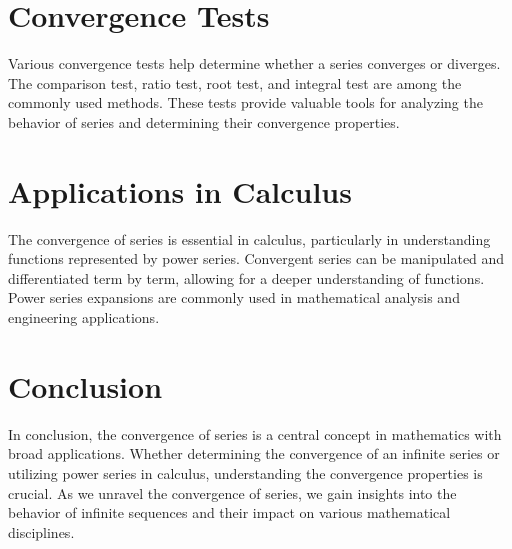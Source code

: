 \documentclass{article}
\begin{document}
\section*{Convergence Tests}
Various convergence tests help determine whether a series converges or diverges. The comparison test, ratio test, root test, and integral test are among the commonly used methods. These tests provide valuable tools for analyzing the behavior of series and determining their convergence properties.

\section*{Applications in Calculus}
The convergence of series is essential in calculus, particularly in understanding functions represented by power series. Convergent series can be manipulated and differentiated term by term, allowing for a deeper understanding of functions. Power series expansions are commonly used in mathematical analysis and engineering applications.

\section*{Conclusion}
In conclusion, the convergence of series is a central concept in mathematics with broad applications. Whether determining the convergence of an infinite series or utilizing power series in calculus, understanding the convergence properties is crucial. As we unravel the convergence of series, we gain insights into the behavior of infinite sequences and their impact on various mathematical disciplines.
\end{document}
